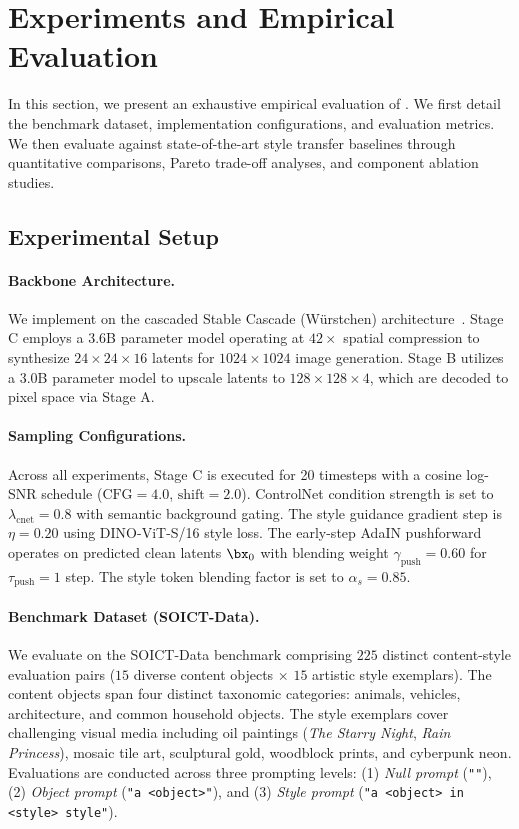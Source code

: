 \section{Experiments and Empirical Evaluation}
\label{sec:experiments}

In this section, we present an exhaustive empirical evaluation of \method. We first detail the benchmark dataset, implementation configurations, and evaluation metrics. We then evaluate \method against state-of-the-art style transfer baselines through quantitative comparisons, Pareto trade-off analyses, and component ablation studies.

\subsection{Experimental Setup}

\paragraph{Backbone Architecture.}
We implement \method on the cascaded Stable Cascade (W{\"u}rstchen) architecture~\cite{pernias2023stablecascade}. Stage C employs a 3.6B parameter model operating at $42\times$ spatial compression to synthesize $24 \times 24 \times 16$ latents for $1024 \times 1024$ image generation. Stage B utilizes a 3.0B parameter model to upscale latents to $128 \times 128 \times 4$, which are decoded to pixel space via Stage A.

\paragraph{Sampling Configurations.}
Across all experiments, Stage C is executed for 20 timesteps with a cosine log-SNR schedule ($\text{CFG} = 4.0$, $\text{shift} = 2.0$). ControlNet condition strength is set to $\lambda_{\text{cnet}} = 0.8$ with semantic background gating. The style guidance gradient step is $\eta = 0.20$ using DINO-ViT-S/16 style loss. The early-step AdaIN pushforward operates on predicted clean latents $\bx_0$ with blending weight $\gamma_{\text{push}} = 0.60$ for $\tau_{\text{push}} = 1$ step. The style token blending factor is set to $\alpha_s = 0.85$.

\paragraph{Benchmark Dataset (SOICT-Data).}
We evaluate on the SOICT-Data benchmark comprising $225$ distinct content-style evaluation pairs ($15$ diverse content objects $\times$ $15$ artistic style exemplars). The content objects span four distinct taxonomic categories: animals, vehicles, architecture, and common household objects. The style exemplars cover challenging visual media including oil paintings (\textit{The Starry Night}, \textit{Rain Princess}), mosaic tile art, sculptural gold, woodblock prints, and cyberpunk neon. Evaluations are conducted across three prompting levels: (1) \textit{Null prompt} (\texttt{""}), (2) \textit{Object prompt} (\texttt{"a <object>"}), and (3) \textit{Style prompt} (\texttt{"a <object> in <style> style"}).


